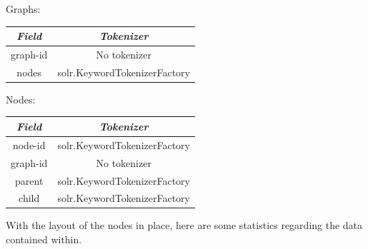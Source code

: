 \documentclass[a4paper,english]{report}
\begin{document}
\begin{center}

Graphs:
\begin{center}
 \begin{tabular}{||c c||} 
 \hline
 \textit{Field} & \textit{Tokenizer} \\ [1ex] 
 \hline\hline

graph-id & No tokenizer\\

\hline

nodes & solr.KeywordTokenizerFactory\\

\hline

\end{tabular}
\end{center}


Nodes:
\begin{center}
 \begin{tabular}{||c c||} 
 \hline
 \textit{Field} & \textit{Tokenizer} \\ [1ex] 
 \hline\hline


node-id & solr.KeywordTokenizerFactory\\

\hline

graph-id & No tokenizer\\

\hline

parent & solr.KeywordTokenizerFactory\\

\hline

child & solr.KeywordTokenizerFactory\\

\hline

\end{tabular}
\end{center}

\begin{flushleft}
With the layout of the nodes in place, here are some statistics regarding the data contained within. 
\end{flushleft}



\end{center}
\end{document}
